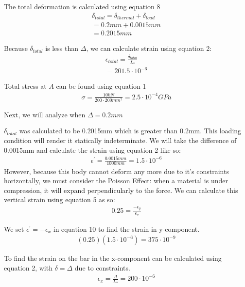 \documentclass[12pt]{article}
\begin{document}
The total deformation is calculated using equation 8
\begin{gather*} 
\delta_{total} = \delta_{thermal} + \delta_{load}\\
= 0.2mm + 0.0015mm\\
=0.2015 mm
\end{gather*}

Because $\delta_{total}$ is less than $\Delta$, we can calculate strain using equation 2:
\begin{gather*}
\epsilon_{total} = \frac{\delta_{total}}{L_{º}}\\
=201.5 \cdot 10^{-6}
\end{gather*}

Total stress at $A$ can be found using equation 1
\begin{gather*}
\sigma = \frac{10 kN}{200 \cdot 200 mm^{2}} = 2.5 \cdot 10^{-4} GPa
\end{gather*}
\pagebreak

Next, we will analyze when $\Delta = 0.2mm$
\newline

$\delta_{total}$ was calculated to be 0.2015mm which is greater than 0.2mm. This loading condition will render it statically indeterminate. We will take the difference of 0.0015mm and calculate the strain using equation 2 like so:
\begin{gather} 
\epsilon^{'} = \frac{0.0015 mm}{1000mm} = 1.5 \cdot 10^{-6}
\end{gather}
However, because this body cannot deform any more due to it's constraints horizontally, we must consider the Poisson Effect: when a material is under compression, it will expand perpendicularly to the force. We can calculate this vertical strain using equation 5 as so:
\begin{gather}
0.25 = \frac{-\epsilon_{y}}{\epsilon_{x}}
\end{gather}

We set $\epsilon^{'} = -\epsilon_{x}$ in equation 10 to find the strain in y-component.
\begin{gather*}
(0.25)(1.5 \cdot 10^{-6}) = 375 \cdot 10^{-9}
\end{gather*}

To find the strain on the bar in the x-component can be calculated using equation 2, with $\delta = \Delta$ due to constraints.
\begin{gather} 
\epsilon_{x} = \frac{\Delta}{L_{º}} = 200 \cdot 10^{-6}
\end{gather}
\end{document}
